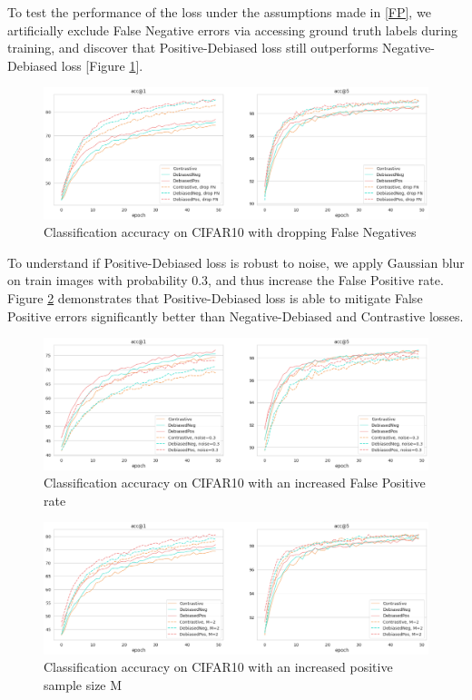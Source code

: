 \documentclass{article}
\begin{document}
To test the performance of the loss under the assumptions made in \ref{FP}, we artificially exclude False Negative errors via accessing ground truth labels during training, and discover that Positive-Debiased loss still outperforms Negative-Debiased loss [Figure \ref{fig:fig3}].

\begin{figure}
\includegraphics[width=1\textwidth]{figures/base_vs_dropfn.png}
\caption{Classification accuracy on CIFAR10 with dropping False Negatives}
\label{fig:fig3}
\end{figure}

To understand if Positive-Debiased loss is robust to noise, we apply Gaussian blur on train images with probability 0.3, and thus increase the False Positive rate. Figure \ref{fig:fig4} demonstrates that Positive-Debiased loss is able to mitigate False Positive errors significantly better than Negative-Debiased and Contrastive losses.

\begin{figure}
\includegraphics[width=1\textwidth]{figures/base_vs_noise.png}
\caption{Classification accuracy on CIFAR10 with an increased False Positive rate}
\label{fig:fig4}
\end{figure}

\begin{figure}
\includegraphics[width=1\textwidth]{figures/base_vs_M=2.png}
\caption{Classification accuracy on CIFAR10 with an increased positive sample size M}
\label{fig:fig5}
\end{figure}
\end{document}
